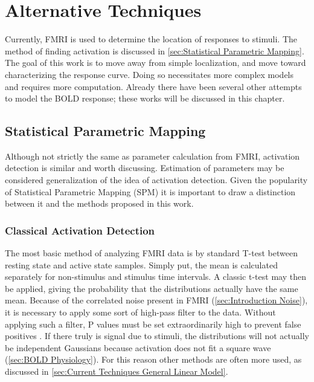 \chapter{Alternative Techniques}
\label{sec:Prior Works}
Currently, FMRI is used to determine the location of responses
to stimuli. The method of finding activation is discussed in 
\autoref{sec:Statistical Parametric Mapping}. The goal of this 
work is to move away from simple localization, and move toward
characterizing the response curve. Doing so 
necessitates more complex models and requires
more computation. Already there have been several other
attempts to model the BOLD response; these works will be discussed
in this chapter.

\section{Statistical Parametric Mapping}
\label{sec:Statistical Parametric Mapping}
Although not strictly the same as parameter calculation from 
FMRI, activation detection is similar and worth discussing. Estimation of 
parameters may be considered generalization of the idea 
of activation detection.
Given the popularity of Statistical Parametric Mapping (SPM) 
it is important to draw a distinction between it and the methods proposed
in this work.

\subsection{Classical Activation Detection}
\label{sec:Square Wave}
The most basic method of analyzing FMRI data is by standard T-test
between resting state and active state samples. Simply put, the
mean is calculated separately for non-stimulus and stimulus time intervals.
A classic t-test may then be applied, giving the probability that the
distributions actually have the same mean. Because of the correlated
noise present in FMRI (\autoref{sec:Introduction Noise}), it is necessary
to apply some sort of high-pass filter to the data. Without applying
such a filter, P values must be set extraordinarily high to prevent
false positives \cite{Smith2007}. If there truly is signal
due to stimuli, the distributions will not actually be independent
Gaussians because activation does not fit a square wave 
(\autoref{sec:BOLD Physiology}). For this reason other methods
are often more used, as discussed in 
\autoref{sec:Current Techniques General Linear Model}.

